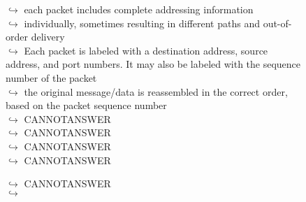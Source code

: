 \documentclass[11pt,a4paper, onecolumn]{article}
\begin{document}
\begin{figure}[t] \small \begin{tcolorbox}[boxsep=0pt,left=5pt,right=0pt,top=2pt,colback = yellow!5] \begin{dialogue}
 \small 
\colorbox{pink!25}{$\hookrightarrow$}
{ each packet includes complete addressing information }
\\
\colorbox{pink!25}{$\hookrightarrow$}
{ individually, sometimes resulting in different paths and out-of-order delivery }
\\
\colorbox{pink!25}{$\hookrightarrow$}
{ Each packet is labeled with a destination address, source address, and port numbers. It may also be labeled with the sequence number of the packet }
\\
\colorbox{pink!25}{$\hookrightarrow$}
{ the original message/data is reassembled in the correct order, based on the packet sequence number }
\\
\colorbox{pink!25}{$\hookrightarrow$}
{ CANNOTANSWER }
\\
\colorbox{pink!25}{$\hookrightarrow$}
{ CANNOTANSWER }
\\
\colorbox{pink!25}{$\hookrightarrow$}
{ CANNOTANSWER }
\\
\colorbox{pink!25}{$\hookrightarrow$}
{ CANNOTANSWER }
 \end{dialogue}\end{tcolorbox}\end{figure}\begin{figure}[t] \small \begin{tcolorbox}[boxsep=0pt,left=5pt,right=0pt,top=2pt,colback = yellow!5] \begin{dialogue}
 \small 
\colorbox{pink!25}{$\hookrightarrow$}
{ CANNOTANSWER }
\\
\colorbox{pink!25}{$\hookrightarrow$}

\end{dialogue}
\end{tcolorbox}
\end{figure}
\end{document}
